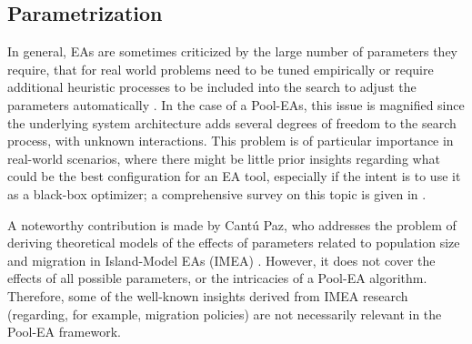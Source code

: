 \subsection{Parametrization}
In general, EAs are sometimes criticized by the large number of parameters they require,
that for real world problems need to be tuned empirically or require additional heuristic processes to be included into the search to
adjust the parameters automatically \cite{parameters,ss}.
In the case of a Pool-EAs, this issue is magnified since the underlying system architecture adds several degrees of freedom to the search process,
with unknown interactions.
This problem is of particular importance in real-world scenarios, where there might be little prior insights regarding what could be the best
configuration for an EA tool, especially if the intent is to use it as a black-box optimizer;
a comprehensive survey on this topic is given in \cite{parameters}. 

A noteworthy contribution is made by Cant\'u Paz, who addresses the problem of deriving theoretical models of the effects
of parameters related to population size and migration in Island-Model EAs (IMEA) \cite{cantu}.
However, it does not cover the effects of all possible parameters, or the intricacies of a Pool-EA algorithm.
Therefore, some of the well-known insights derived from IMEA research (regarding, for example, migration policies) are not necessarily relevant in the Pool-EA framework.

